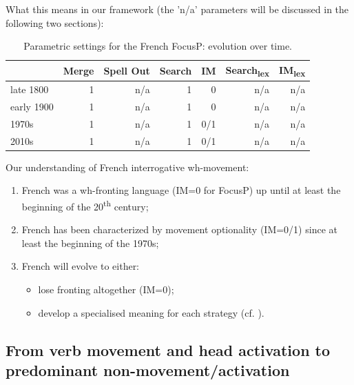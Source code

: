 \documentclass[fleqn,10pt]{wlscirep}
\begin{document}
\noindent What this means in our framework (the 'n/a' parameters will be discussed in the following two sections):

    \begin{table}[H]
        \centering
        \begin{tabular}{|l|r|r|r|r|r|r|}
        \hline
         & Merge & Spell Out & Search & IM & Search\textsubscript{lex} & IM\textsubscript{lex} \\
        \hline
        late 1800 & 1 & n/a & 1 & 0 & n/a & n/a \\
        \hline
        early 1900 & 1 & n/a & 1 & 0 & n/a & n/a \\
        \hline
        1970s & 1 & n/a & 1 & 0/1 & n/a & n/a \\
        \hline
        2010s & 1 & n/a & 1 & 0/1 & n/a & n/a \\
        \hline
        \end{tabular}
        \caption{\label{tab:samp}Parametric settings for the French FocusP: evolution over time.}
    \end{table}

\noindent Our understanding of French interrogative wh-movement:
    \begin{enumerate}
        \item French was a wh-fronting language (IM=0 for FocusP) up until at least the beginning of the 20\textsuperscript{th} century;
        \item \vspace*{-2mm} French has been characterized by movement optionality (IM=0/1) since at least the beginning of the 1970s;
        \item \vspace*{-2mm} French will evolve to either:
        \begin{itemize}
            \item \vspace*{-2mm} lose fronting altogether (IM=0);
            \item \vspace*{-2mm} develop a specialised meaning for each strategy (cf. \citealt{faure2021exclusivity}).
        \end{itemize}    
    \end{enumerate}

\subsection*{From verb movement and head activation to predominant non-movement/activation}
\end{document}
